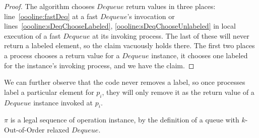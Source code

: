 \documentclass[a4paper,anonymous,USenglish]{lipics-v2021}
\theoremstyle{definition}
\begin{document}
\begin{proof}
  The algorithm chooses $Dequeue$ return values in three places: line~\ref{oooline:fastDeq} at a fast $Dequeue$'s invocation or lines~\ref{oooline:sDeqChooseLabeled}, \ref{oooline:sDeqChooseUnlabeled} in local execution of a fast $Dequeue$ at its invoking process.  The last of these will never return a labeled element, so the claim vacuously holds there.  The first two places a process chooses a return value for a $Dequeue$ instance, it chooses one labeled for the instance's invoking process, and we have the claim.
\end{proof}

We can further observe that the code never removes a label, so once processes label a particular element for $p_i$, they will only remove it as the return value of a $Dequeue$ instance invoked at $p_i$.

\begin{lemma}
  $\pi$ is a legal sequence of operation instance, by the definition of a queue with $k$-Out-of-Order relaxed $Dequeue$.
\end{lemma}
\end{document}
